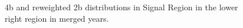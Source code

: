 \begin{figure}[ht]
 
 
    \caption{4b and reweighted 2b distributions in Signal Region in the lower right region in merged years.}
    \label{fig:lower-right-4bvbf-SR-all}
\end{figure}



